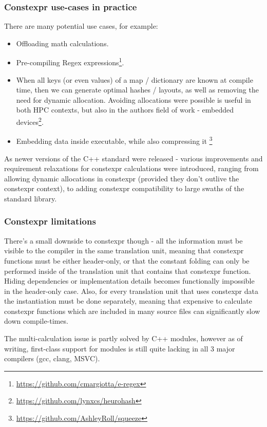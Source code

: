 \documentclass[
    english, %
]{VUMIFPSkursinis}
\begin{document}
\FloatBarrier
\subsubsection{Constexpr use-cases in practice}

There are many potential use cases, for example:
\begin{itemize}
    \item Offloading math calculations.
    \item Pre-compiling Regex expressions\footnote{\url{https://github.com/cmargiotta/e-regex}}.
    \item When all keys (or even values) of a map / dictionary are known at compile time, then we can generate optimal hashes / layouts, as well as removing the need for dynamic allocation. Avoiding allocations were possible is useful in both HPC contexts, but also in the authors field of work - embedded devices\footnote{\url{https://github.com/lynxcs/heurohash}}.
    \item Embedding data inside executable, while also compressing it \footnote{\url{https://github.com/AshleyRoll/squeeze}}
\end{itemize}

As newer versions of the C++ standard were released - various improvements and requirement relaxations for constexpr calculations were introduced, ranging from
allowing dynamic allocations in constexpr (provided they don't outlive the constexpr context),
to adding constexpr compatibility to large swaths of the standard library.

\FloatBarrier
\subsubsection{Constexpr limitations}

There's a small downside to constexpr though - all the information must be visible to the compiler in the same
translation unit, meaning that constexpr functions must be either header-only, or that the constant folding can only be performed inside of the translation unit that contains that constexpr function. Hiding dependencies or implementation details
becomes functionally impossible in the header-only case. Also, for every translation unit that uses constexpr data the instantiation must be done
separately, meaning that expensive to calculate constexpr functions which are included in many source files can significantly slow down compile-times.

The multi-calculation issue is partly solved by C++ modules, however as of writing, first-class support for modules
is still quite lacking in all 3 major compilers (gcc, clang, MSVC).
\end{document}
